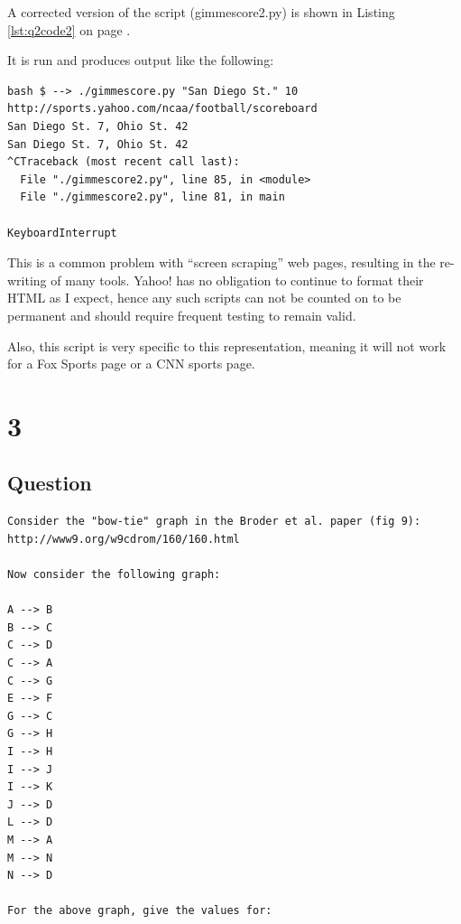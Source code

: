 \documentclass[letterpaper,11pt]{article}
\begin{document}
{\newpage
A corrected version of the script (gimmescore2.py) is shown in Listing \ref{lst:q2code2} on page \pageref{lst:q2code2}.  

It is run and produces output like the following:
\begin{lstlisting}[frame=single]
bash $ --> ./gimmescore.py "San Diego St." 10 http://sports.yahoo.com/ncaa/football/scoreboard
San Diego St. 7, Ohio St. 42
San Diego St. 7, Ohio St. 42
^CTraceback (most recent call last):
  File "./gimmescore2.py", line 85, in <module>
  File "./gimmescore2.py", line 81, in main
    
KeyboardInterrupt

\end{lstlisting}

This is a common problem with ``screen scraping'' web pages, resulting in the re-writing of many tools.  Yahoo! has no obligation to continue to format their HTML as I expect, hence any such scripts can not be counted on to be permanent and should require frequent testing to remain valid.

Also, this script is very specific to this representation, meaning it will not work for a Fox Sports page or a CNN sports page.

\newpage




\newpage
\section*{3}

\subsection*{Question}

\begin{verbatim}
Consider the "bow-tie" graph in the Broder et al. paper (fig 9):
http://www9.org/w9cdrom/160/160.html

Now consider the following graph:

A --> B
B --> C
C --> D
C --> A
C --> G
E --> F
G --> C
G --> H
I --> H
I --> J
I --> K
J --> D 
L --> D
M --> A
M --> N
N --> D
    
For the above graph, give the values for:


\end{verbatim}}
\end{document}
